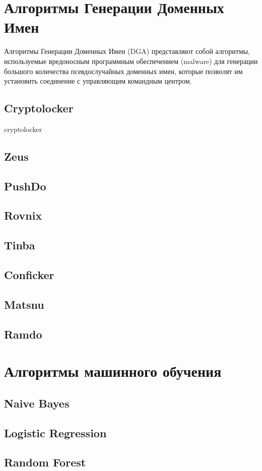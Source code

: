 \section{Алгоритмы Генерации Доменных Имен}
Алгоритмы Генерации Доменных Имен (DGA) представляют собой алгоритмы, используемые вредоносным программным обеспечением (malware) для генерации большого количества псевдослучайных доменных имен, которые позволят им установить соединение с управляющим командным центром.
\subsection{Cryptolocker}
cryptolocker
\subsection{Zeus}
\subsection{PushDo}
\subsection{Rovnix}
\subsection{Tinba}
\subsection{Conficker}
\subsection{Matsnu}
\subsection{Ramdo}

\section{Алгоритмы машинного обучения}
\subsection{Naive Bayes}
\subsection{Logistic Regression}
\subsection{Random Forest}
